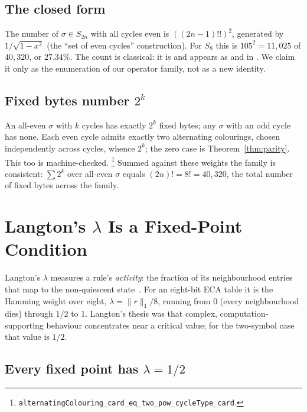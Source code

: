 \documentclass[man,12pt,floatsintext]{apa7}
\newcommand{\sig}{\sigma}
\begin{document}
\subsection{The closed form}

The number of $\sig \in S_{2n}$ with all cycles even is $((2n-1)!!)^2$,
generated by $1/\sqrt{1-x^2}$ (the ``set of even cycles'' construction).
For $S_8$ this is $105^2 = 11{,}025$ of $40{,}320$, or $27.34\%$. The count
is classical: it is \textcite{oeis_a001818} and appears as
\textcite[Problem~5.34(c)]{stanley1999enumerative} and in
\textcite{riordan1968combinatorial}. We claim it only as the enumeration of
our operator family, not as a new identity.

\subsection{Fixed bytes number $2^k$}

An all-even $\sig$ with $k$ cycles has exactly $2^k$ fixed bytes; any
$\sig$ with an odd cycle has none. Each even cycle admits exactly two
alternating colourings, chosen independently across cycles, whence $2^k$;
the zero case is Theorem~\ref{thm:parity}. This too is machine-checked.%
\footnote{\texttt{alternatingColouring\_card\_eq\_two\_pow\_cycleType\_card}.}
Summed against these weights the family is consistent:
$\sum 2^{k}$ over all-even $\sig$ equals $(2n)! = 8! = 40{,}320$, the total
number of fixed bytes across the family.

\section{Langton's $\lambda$ Is a Fixed-Point Condition}
\label{sec:lambda}

Langton's $\lambda$ measures a rule's \emph{activity}: the fraction of its
neighbourhood entries that map to the non-quiescent
state~\parencite{langton1990computation}. For an eight-bit ECA table it is
the Hamming weight over eight, $\lambda = \lVert r \rVert_1 / 8$, running
from $0$ (every neighbourhood dies) through $1/2$ to $1$. Langton's thesis
was that complex, computation-supporting behaviour concentrates near a
critical value; for the two-symbol case that value is $1/2$.

\subsection{Every fixed point has $\lambda = 1/2$}
\end{document}
